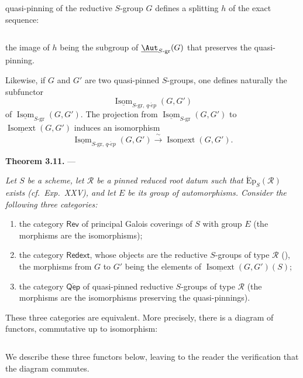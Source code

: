 quasi-pinning of the reductive \(S\)-group \(G\) defines a splitting
\(h\) of the exact sequence:

\[
  
\]

the image of \(h\) being the subgroup of
\(\underline{\Aut}_{S\text{-}\mathrm{gr}}(G)\) that preserves the
quasi-pinning.

Likewise, if \(G\) and \(G'\) are two quasi-pinned \(S\)-groups, one
defines naturally the subfunctor
\[
  \underline{\operatorname{Isom}}_{S\text{-}\mathrm{gr},\,q\text{-}\acute{e}p}
    (G,G')
\]
of
\(\underline{\operatorname{Isom}}_{S\text{-}\mathrm{gr}}(G,G')\).
The projection from
\(\underline{\operatorname{Isom}}_{S\text{-}\mathrm{gr}}(G,G')\)
to \(\underline{\operatorname{Isomext}}(G,G')\) induces an
isomorphism
\[
  \underline{\operatorname{Isom}}_{S\text{-}\mathrm{gr},\,q\text{-}\acute{e}p}
    (G,G')
  \xrightarrow{\ \sim\ }
  \underline{\operatorname{Isomext}}(G,G').
\]

\medskip\noindent\textbf{Theorem 3.11.} ---
{\itshape Let \(S\) be a scheme, let \(\mathscr R\) be a pinned reduced
root datum such that
\(\operatorname{\acute{E}p}_S(\mathscr R)\) exists
(cf.\ Exp.~XXV), and let \(E\) be its group of automorphisms.
Consider the following three categories:
\begin{enumerate}
\item[\SGAInlineRefTarget{sga3:xxiv:3.11:item:i}(i)] the category \(\mathsf{Rev}\) of principal Galois coverings
of \(S\) with group \(E\) (the morphisms are the isomorphisms);
\item[\SGAInlineRefTarget{sga3:xxiv:3.11:item:ii}(ii)] the category \(\mathsf{Redext}\), whose objects are the
reductive \(S\)-groups of type \(\mathscr R\) (), the
morphisms from \(G\) to \(G'\) being the elements of
\(\underline{\operatorname{Isomext}}(G,G')(S)\);
\item[(iii)] the category \(\mathsf{Q\acute{e}p}\) of quasi-pinned
reductive \(S\)-groups of type \(\mathscr R\) (the morphisms are the
isomorphisms preserving the quasi-pinnings).
\end{enumerate}
These three categories are equivalent. More precisely, there is a
diagram of functors, commutative up to
isomorphism:}

\[
  
\]

We describe these three functors below, leaving to the reader the
verification that the diagram commutes.

